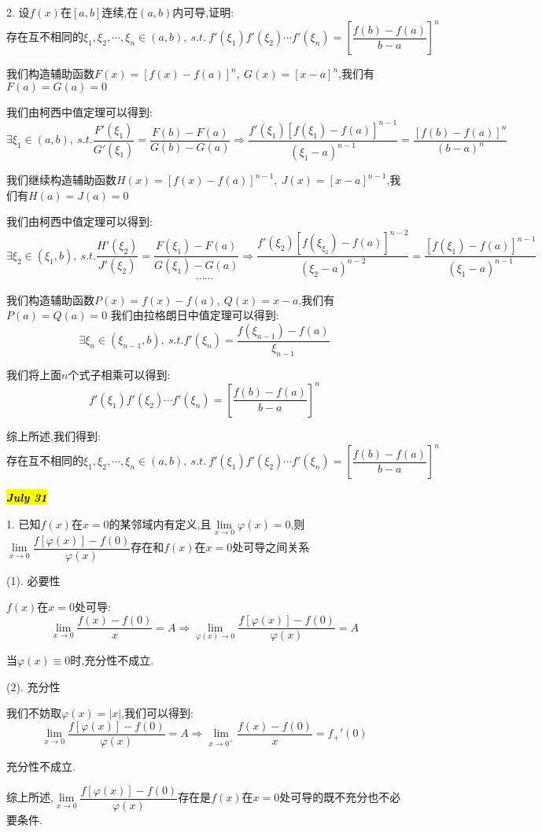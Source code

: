 2. 设$f(x)$在$[a,b]$连续,在$(a,b)$内可导,证明: $$\text{存在互不相同的}\xi_{1},\xi_{2},\cdots,\xi_{n}\in(a,b),\ s.t. \ f'(\xi_{1})f'(\xi_{2})\cdots f'(\xi_{n})=\left[ \dfrac{f(b)-f(a)}{b-a}\right]^{n}$$
\begin{solution}
	
	我们构造辅助函数$F(x)=\left[ f(x)-f(a)\right]^n,\ G(x)=\left[ x-a\right]^n $,我们有$F(a)=G(a)=0$
	
	我们由柯西中值定理可以得到: 
	$$\exists \xi_{1}\in(a,b),\ s.t. \dfrac{F'(\xi_{1})}{G'(\xi_{1})}=\dfrac{F(b)-F(a)}{G(b)-G(a)}\Rightarrow \dfrac{f'(\xi_{1})\left[f(\xi_{1})-f(a) \right]^{n-1}}{(\xi_{1}-a)^{n-1}}=\dfrac{\left[f(b)-f(a) \right]^n }{(b-a)^n}$$
	
	我们继续构造辅助函数$H(x)=\left[ f(x)-f(a)\right]^{n-1},\ J(x)=\left[ x-a\right]^{n-1} $,我们有$H(a)=J(a)=0$
	
	我们由柯西中值定理可以得到: 
	$$\exists \xi_{2}\in(\xi_{1},b),\ s.t. \dfrac{H'(\xi_{2})}{J'(\xi_{2})}=\dfrac{F(\xi_{1})-F(a)}{G(\xi_{1})-G(a)}\Rightarrow \dfrac{f'(\xi_{2})\left[f(\xi_{\xi_{2}})-f(a) \right]^{n-2}}{(\xi_{2}-a)^{n-2}}=\dfrac{\left[f(\xi_{1})-f(a) \right]^{n-1} }{(\xi_{1}-a)^{n-1}}$$
	$$\cdots\cdots$$
	
	我们构造辅助函数$P(x)=f(x)-f(a),\ Q(x)=x-a$,我们有$P(a)=Q(a)=0$
	我们由拉格朗日中值定理可以得到: 
	$$\exists \xi_{n}\in(\xi_{n-1},b),\ s.t. f'(\xi_{n})=\dfrac{f(\xi_{n-1})-f(a)}{\xi_{n-1}}$$
	
	我们将上面$n$个式子相乘可以得到: 
	$$f'(\xi_{1})f'(\xi_{2})\cdots f'(\xi_{n})=\left[ \dfrac{f(b)-f(a)}{b-a}\right]^{n}$$
	
	综上所述,我们得到: 
	$$\text{存在互不相同的}\xi_{1},\xi_{2},\cdots,\xi_{n}\in(a,b),\ s.t. \ f'(\xi_{1})f'(\xi_{2})\cdots f'(\xi_{n})=\left[ \dfrac{f(b)-f(a)}{b-a}\right]^{n}$$
\end{solution}

\hl{\textbf{\textit{July 31}}}

1. 已知$f(x)$在$x=0$的某邻域内有定义,且$\lim\limits_{x\rightarrow 0}\varphi(x)=0$,则$\lim\limits_{x\rightarrow 0}\dfrac{f[\varphi(x)]-f(0)}{\varphi(x)}$存在和$f(x)$在$x=0$处可导之间关系
\begin{solution}
	
	(1). 必要性
	
	$f(x)$在$x=0$处可导: 
	$$\lim\limits_{x\rightarrow 0}\dfrac{f(x)-f(0)}{x}=A\Rightarrow \lim\limits_{\varphi(x)\rightarrow 0}\dfrac{f[\varphi(x)]-f(0)}{\varphi(x)}=A$$
	
	当$\varphi(x)\equiv 0$时,充分性不成立.
	
	(2). 充分性
	
	我们不妨取$\varphi(x)=|x|$,我们可以得到: 
	$$\lim\limits_{x\rightarrow 0}\dfrac{f[\varphi(x)]-f(0)}{\varphi(x)}=A\Rightarrow \lim\limits_{x\rightarrow 0^{+}}\dfrac{f(x)-f(0)}{x}=f_{+}'(0)$$
	
	充分性不成立.
	
	综上所述,$\lim\limits_{x\rightarrow 0}\dfrac{f[\varphi(x)]-f(0)}{\varphi(x)}$存在是$f(x)$在$x=0$处可导的既不充分也不必要条件.
\end{solution}


